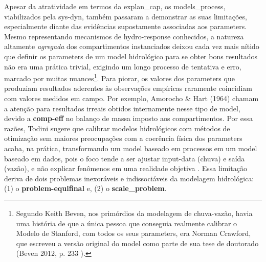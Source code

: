 \documentclass[./main.tex]{subfiles}
\begin{document}
\par Apesar da atratividade em termos da \gls{explan_cap}, os \gls{models_process}, viabilizados pela \gls{sys-dyn}, também passaram a demonstrar as suas limitações, especialmente diante das evidências supostamente associadas aos \gls{parameters}. Mesmo representando mecanismos de \gls{hydro-response} conhecidos, a natureza altamente \textit{agregada} dos compartimentos instanciados deixou cada vez mais nítido que definir os \gls{parameters} de um \gls{model} hidrológico para se obter bons resultados não era uma prática trivial, exigindo um longo processo de tentativa e erro, marcado por muitas nuances\footnote{Segundo Keith Beven, nos primórdios da modelagem de chuva-vazão, havia uma história de que a única pessoa que conseguia realmente calibrar o Modelo de Stanford, com todos os seus \gls{parameters}, era Norman Crawford, que escreveu a versão original do \gls{model} como parte de sua tese de doutorado (Beven 2012, p. 233 \cite{Beven2012}).}. Para piorar, os valores dos \gls{parameters} que produziam resultados aderentes às observações empíricas raramente coincidiam com valores medidos em campo. Por exemplo, Amorocho \& Hart (1964) \cite{Amorocho1964a} chamam a atenção para resultados irreais obtidos internamente nesse tipo de \gls{model}, devido a \textbf{\gls{comp-eff}} no balanço de massa imposto aos compartimentos. Por essa razões, Todini sugere que calibrar modelos hidrológicos com métodos de otimização sem maiores preocupações com a coerência física dos \gls{parameters} acaba, na prática, transformando um \gls{model} baseado em processos em um \gls{model} baseado em dados, pois o foco tende a ser ajustar \gls{input-data} (chuva) e saída (vazão), e não explicar fenômenos em uma realidade objetiva \cite{Todini2007a}. Essa limitação deriva de dois problemas inexoráveis e indissociáveis da modelagem hidrológica: (1) o \textbf{\gls{problem-equifinal}} e, (2) o \textbf{\gls{scale_problem}}. 
\end{document}
